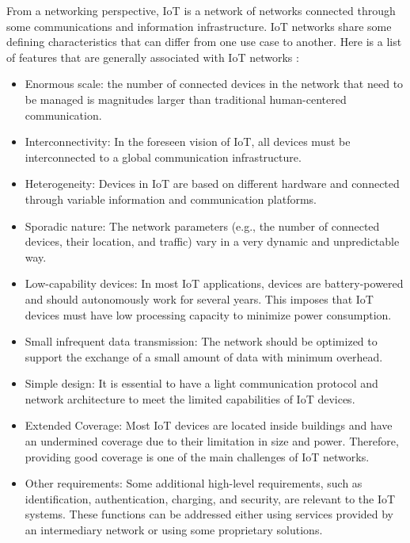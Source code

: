 \documentclass[]{IEEEtran}
\begin{document}
From a networking perspective, IoT is a network of networks connected through some communications and information infrastructure. IoT networks share some defining characteristics that can differ from one use case to another. Here is a list of features that are generally associated with IoT networks \cite{itu-t_overview_2012_Y.2060,3gpp_service_nodate_22.368}:
\begin{itemize}
    \item Enormous scale: the number of connected devices in the network that need to be managed is magnitudes larger than traditional human-centered communication.
    \item Interconnectivity: In the foreseen vision of IoT, all devices must be interconnected to a global communication infrastructure.
    \item Heterogeneity: Devices in IoT are based on different hardware and connected through variable information and communication platforms.
    \item Sporadic nature: The network parameters (e.g., the number of connected devices, their location, and traffic) vary in a very dynamic and unpredictable way.
    \item Low-capability devices: In most IoT applications, devices are battery-powered and should autonomously work for several years. This imposes that IoT devices must have low processing capacity to minimize power consumption.
    \item Small infrequent data transmission: The network should be optimized to support the exchange of a small amount of data with minimum overhead.
    \item Simple design: It is essential to have a light communication protocol and network architecture to meet the limited capabilities of IoT devices.
    \item Extended Coverage: Most IoT devices are located inside buildings and have an undermined coverage due to their limitation in size and power. Therefore, providing good coverage is one of the main challenges of IoT networks.
    \item Other requirements: Some additional high-level requirements, such as identification, authentication, charging, and security, are relevant to the IoT systems. These functions can be addressed either using services provided by an intermediary network or using some proprietary solutions.
\end{itemize}
\end{document}
